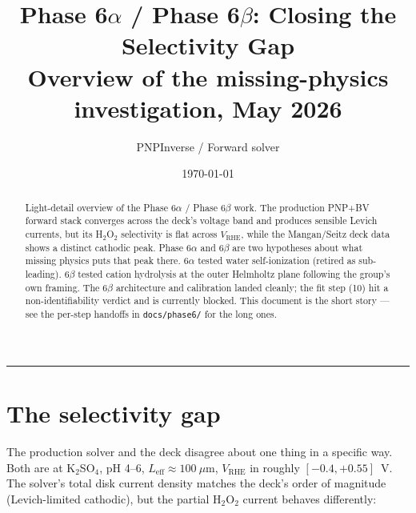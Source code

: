 \documentclass[11pt]{article}
\title{\bfseries Phase 6$\alpha$ / Phase 6$\beta$:
       Closing the Selectivity Gap\\[2pt]
       \large{\normalfont Overview of the missing-physics investigation,
       May 2026}}
\author{\normalsize PNPInverse / Forward solver}
\date{\today}
\begin{document}
\maketitle

\begin{abstract}\noindent
Light-detail overview of the Phase 6$\alpha$ / Phase 6$\beta$ work.
The production PNP+BV forward stack converges across the deck's
voltage band and produces sensible Levich currents, but its H$_2$O$_2$
selectivity is flat across $V_{\mathrm{RHE}}$, while the Mangan/Seitz
deck data shows a distinct cathodic peak.  Phase 6$\alpha$ and 6$\beta$
are two hypotheses about what missing physics puts that peak there.
6$\alpha$ tested water self-ionization (retired as sub-leading).
6$\beta$ tested cation hydrolysis at the outer Helmholtz plane
following the group's own framing.  The 6$\beta$ architecture and
calibration landed cleanly; the fit step (10) hit a
non-identifiability verdict and is currently blocked.  This document
is the short story --- see the per-step handoffs in
\texttt{docs/phase6/} for the long ones.
\end{abstract}

\vspace{-0.4em}\hrule\vspace{0.4em}

\section{The selectivity gap}

The production solver and the deck disagree about one thing in a
specific way.  Both are at K$_2$SO$_4$, pH 4--6, $L_{\mathrm{eff}}
\approx 100~\mu$m, $V_{\mathrm{RHE}}$ in roughly $[-0.4, +0.55]$~V.
The solver's total disk current density matches the deck's order of
magnitude (Levich-limited cathodic), but the partial H$_2$O$_2$
current behaves differently:
\end{document}
